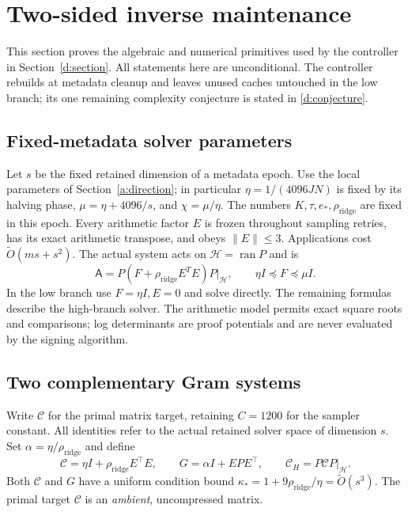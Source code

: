 \documentclass[11pt]{amsart}
\theoremstyle{definition}\newtheorem{definition}[theorem]{Definition}
\theoremstyle{remark}\newtheorem{remark}[theorem]{Remark}
\numberwithin{equation}{section}
\begin{document}
\section{Two-sided inverse maintenance}\label{c:section}
This section proves the algebraic and numerical primitives used by the
controller in Section~\ref{d:section}. All statements here are
unconditional. The controller rebuilds at metadata cleanup and leaves
unused caches untouched in the low branch; its one remaining complexity
conjecture is stated in \eqref{d:conjecture}.

\subsection{Fixed-metadata solver parameters}\label{c:padding}
Let $s$ be the fixed retained dimension of a metadata epoch. Use the local
parameters of Section~\ref{a:direction}; in particular
$\eta=1/(4096JN)$ is fixed by its halving phase,
$\mu=\eta+4096/s$, and $\chi=\mu/\eta$.
The numbers $K,\tau,e_*,\rho_{\mathrm{ridge}}$ are fixed in this epoch.
Every arithmetic factor $E$ is frozen throughout
sampling retries, has its exact arithmetic transpose, and obeys
$\|E\|\le3$. Applications cost $\widetilde O(ms+s^2)$.
The actual system acts on $\mathcal H=\operatorname{ran}P$ and is
\begin{equation}\label{c:target}
 \mathsf A=P(F+\rho_{\mathrm{ridge}}E^TE)P\big|_{\mathcal H},
 \qquad \eta I\preceq F\preceq\mu I.
\end{equation}
In the low branch use $F=\eta I,E=0$ and solve directly. The remaining
formulas describe the high-branch solver. The arithmetic model permits
exact square roots and comparisons; log determinants are proof
potentials and are never evaluated by the signing algorithm.

\subsection{Two complementary Gram systems}\label{c:grams}
Write $\mathcal C$ for the primal matrix target, retaining $C=1200$
for the sampler constant. All identities refer to the actual retained solver space of dimension $s$.
Set $\alpha=\eta/\rho_{\mathrm{ridge}}$ and define
\begin{equation}\label{c:eq:two}
 \mathcal C=\eta I+\rho_{\mathrm{ridge}} E^\top E,\qquad
 G=\alpha I+EPE^\top,\qquad
 \mathcal C_H=P\mathcal C P\big|_{\mathcal H}.
\end{equation}
Both $\mathcal C$ and $G$ have a uniform condition bound
$\kappa_*=1+9\rho_{\mathrm{ridge}}/\eta=\widetilde O(s^3)$.
The primal target $\mathcal C$ is an \emph{ambient}, uncompressed matrix.
\end{document}
